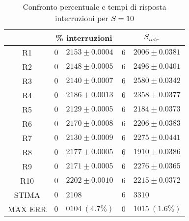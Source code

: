 \begin{table}[!h]
\begin{tabular}{c|r@{.}l|r@{.}l}
& \multicolumn{2}{|c|}{\% interruzioni}
& \multicolumn{2}{|c}{$S_{intr}$}
\\          
\hline
R1      & $0$&$2153 \pm 0.0004$ & $6$&$2006 \pm 0.0381$ \\
R2      & $0$&$2148 \pm 0.0005$ & $6$&$2496 \pm 0.0401$ \\
R3      & $0$&$2140 \pm 0.0007$ & $6$&$2580 \pm 0.0342$ \\
R4      & $0$&$2186 \pm 0.0013$ & $6$&$2358 \pm 0.0377$ \\
R5      & $0$&$2129 \pm 0.0005$ & $6$&$2184 \pm 0.0373$ \\
R6      & $0$&$2170 \pm 0.0008$ & $6$&$2206 \pm 0.0383$ \\
R7      & $0$&$2130 \pm 0.0009$ & $6$&$2275 \pm 0.0441$ \\
R8      & $0$&$2177 \pm 0.0005$ & $6$&$1910 \pm 0.0386$ \\
R9      & $0$&$2171 \pm 0.0005$ & $6$&$2276 \pm 0.0365$ \\
R10     & $0$&$2202 \pm 0.0010$ & $6$&$2215 \pm 0.0372$ \\
STIMA   & $0$&$2108$            & $6$&$3310$            \\
MAX ERR & $0$&$0104 \ (4.7\%)$  & $0$&$1015 \ (1.6\%)$    
\end{tabular}
\centering
\caption{Confronto percentuale e tempi di risposta interruzioni per $S=10$}
\label{tab:10_sintr}
\end{table}
